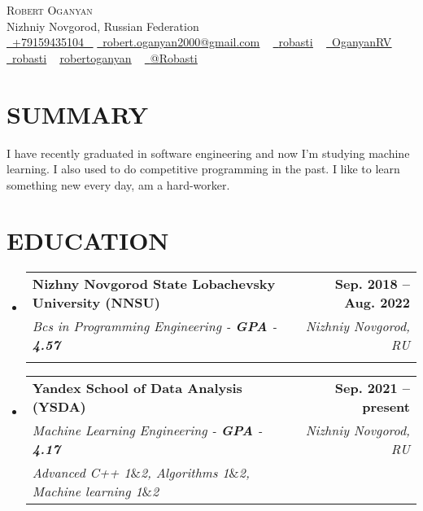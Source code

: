 \documentclass[letterpaper,11pt]{article}
\makeatletter
\newcommand{\resumeSubheading}[5]{
  \vspace{-2pt}\item
    \begin{tabular*}{1.0\textwidth}[t]{l@{\extracolsep{\fill}}r}
      \textbf{\large#1} & \textbf{\small #2} \\
      \textit{\large#3} & \textit{\small #4} \\
      \textit{\large#5} \\
      
    \end{tabular*}\vspace{-7pt}
}
\newcommand{\resumeSubHeadingListStart}{\begin{itemize}[leftmargin=0.0in, label={}]}
\newcommand{\resumeSubHeadingListEnd}{\end{itemize}}
\makeatother
\begin{document}


\begin{center}
    {\Huge \scshape Robert Oganyan} \\ \vspace{1pt}
    Nizhniy Novgorod, Russian Federation \\ \vspace{1pt}
    \small \href{tel:+xxxxxxxxxxxx}{ \raisebox{-0.1\height}\faPhone\ \underline{+79159435104} ~} 
    \href{mailto:yourname@gmail.com}{\raisebox{-0.2\height}\faEnvelope\  \underline{robert.oganyan2000@gmail.com}} ~ 
    \href{https://t.me/robasti}{\raisebox{-0.2\height}\faTelegram\ \underline{robasti}} ~
    \href{https://github.com/OganyanRV}{\raisebox{-0.2\height}\faGithub\ \underline{OganyanRV}} ~
    \href{https://codeforces.com/profile/robasti}{\raisebox{-0.2\height}\faPoll\ \underline{robasti}} ~
    \href{https://www.kaggle.com/robertoganyan}{\raisebox{-0.2\height}\faKaggle\underline{robertoganyan}} ~
    \href{https://medium.com/@Robasti}{\raisebox{-0.2\height}\faMedium\ \underline{@Robasti}}
    \vspace{-8pt}
\end{center}

\section{SUMMARY}
I have recently graduated in software engineering and now I'm studying machine learning. I also used to do competitive programming in the past. I like to learn something new every day, am a hard-worker.

\section{EDUCATION}
  \resumeSubHeadingListStart
    \resumeSubheading
      {Nizhny Novgorod State Lobachevsky University (NNSU)}{Sep. 2018 -- Aug. 2022}
      {Bcs in Programming Engineering - \textbf{GPA} - \textbf{4.57}}{Nizhniy Novgorod, RU}
      {}
  \resumeSubHeadingListEnd
  
  \resumeSubHeadingListStart
    \resumeSubheading
      {Yandex School of Data Analysis (YSDA)}{Sep. 2021 -- present}
      {Machine Learning Engineering  - \textbf{GPA} - \textbf{4.17}}{Nizhniy Novgorod, RU}
      {Advanced C++ 1$\&$2, Algorithms 1$\&$2, Machine learning 1$\&$2}
  \resumeSubHeadingListEnd
\end{document}
